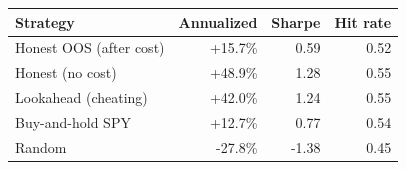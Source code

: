 \begin{tabular}{lrrr}
\toprule
Strategy & Annualized & Sharpe & Hit rate \\
\midrule
Honest OOS (after cost) & +15.7\% & 0.59 & 0.52 \\
Honest (no cost) & +48.9\% & 1.28 & 0.55 \\
Lookahead (cheating) & +42.0\% & 1.24 & 0.55 \\
Buy-and-hold SPY & +12.7\% & 0.77 & 0.54 \\
Random & -27.8\% & -1.38 & 0.45 \\
\bottomrule
\end{tabular}
